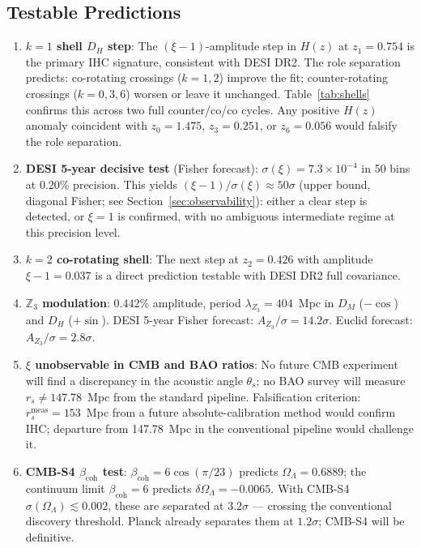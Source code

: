 \documentclass[12pt,a4paper]{article}
\begin{document}
\subsection{Testable Predictions}

\begin{enumerate}
  \item \textbf{$k=1$ shell $D_H$ step}: The $(\xi-1)$-amplitude step in $H(z)$ at
        $z_1 = 0.754$ is the primary IHC signature, consistent with DESI DR2.
        The role separation predicts: co-rotating crossings ($k=1,2$) improve the
        fit; counter-rotating crossings ($k=0,3,6$) worsen or leave it unchanged.
        Table~\ref{tab:shells} confirms this across two full counter/co/co cycles.
        Any positive $H(z)$ anomaly coincident with $z_0=1.475$, $z_3=0.251$, or
        $z_6=0.056$ would falsify the role separation.

  \item \textbf{DESI 5-year decisive test} (Fisher forecast):
        $\sigma(\xi) = 7.3 \times 10^{-4}$ in 50 bins at 0.20\% precision.
        This yields $(\xi-1)/\sigma(\xi) \approx 50\sigma$ (upper bound,
        diagonal Fisher; see Section~\ref{sec:observability}): either a clear step
        is detected, or $\xi = 1$ is confirmed, with no ambiguous intermediate
        regime at this precision level.

  \item \textbf{$k=2$ co-rotating shell}: The next step at $z_2 = 0.426$ with
        amplitude $\xi - 1 = 0.037$ is a direct prediction testable with DESI
        DR2 full covariance.

  \item \textbf{$\mathbb{Z}_3$ modulation}: $0.442\%$ amplitude, period
        $\lambda_{Z_3} = 404$~Mpc in $D_M$ ($-\cos$) and $D_H$ ($+\sin$).
        DESI 5-year Fisher forecast: $A_{Z_3}/\sigma = 14.2\sigma$.
        Euclid forecast: $A_{Z_3}/\sigma = 2.8\sigma$.

  \item \textbf{$\xi$ unobservable in CMB and BAO ratios}: No future CMB
        experiment will find a discrepancy in the acoustic angle $\theta_s$; no
        BAO survey will measure $r_s \neq 147.78$~Mpc from the standard pipeline.
        Falsification criterion: $r_s^\mathrm{meas} = 153$~Mpc from a future
        absolute-calibration method would confirm IHC; departure from 147.78~Mpc
        in the conventional pipeline would challenge it.

  \item \textbf{CMB-S4 $\beta_\mathrm{coh}$ test}: $\beta_\mathrm{coh} =
        6\cos(\pi/23)$ predicts $\Omega_\Lambda = 0.6889$; the continuum limit
        $\beta_\mathrm{coh} = 6$ predicts $\delta\Omega_\Lambda = -0.0065$.
        With CMB-S4 $\sigma(\Omega_\Lambda) \lesssim 0.002$, these are separated
        at $3.2\sigma$ --- crossing the conventional discovery threshold.
        Planck already separates them at $1.2\sigma$; CMB-S4 will be definitive.


\end{enumerate}
\end{document}
